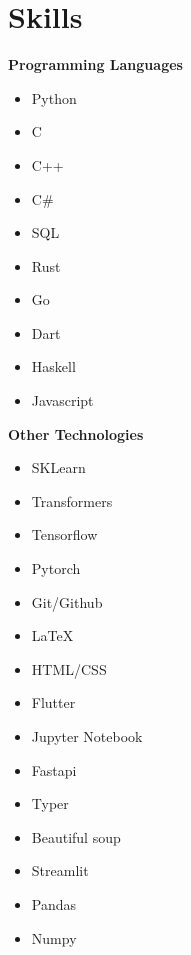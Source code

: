 \documentclass{article}
\begin{document}
\section*{Skills}
\begin{multicols}{2}
\raggedcolumns
\textbf{Programming Languages}
\begin{itemize}
    \item Python
    \item C
    \item C++
    \item C\#
    \item SQL
    \item Rust
    \item Go
    \item Dart
    \item Haskell
    \item Javascript
\end{itemize}
\columnbreak
\textbf{Other Technologies}
\begin{itemize}
    \item SKLearn
    \item Transformers
    \item Tensorflow
    \item Pytorch
    \item Git/Github
    \item LaTeX
    \item HTML/CSS
    \item Flutter
    \item Jupyter Notebook
    \item Fastapi
    \item Typer
    \item Beautiful soup
    \item Streamlit
    \item Pandas
    \item Numpy
\end{itemize}
\end{multicols}


\newpage
\end{document}
